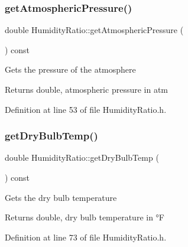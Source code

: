 \subsubsection{\texorpdfstring{get\+Atmospheric\+Pressure()}{getAtmosphericPressure()}\hspace{0.1cm}{\footnotesize\ttfamily [3/3]}}
{\footnotesize\ttfamily double Humidity\+Ratio\+::get\+Atmospheric\+Pressure (\begin{DoxyParamCaption}{ }\end{DoxyParamCaption}) const\hspace{0.3cm}{\ttfamily [inline]}}

Gets the pressure of the atmosphere

\begin{DoxyReturn}{Returns}
double, atmospheric pressure in atm 
\end{DoxyReturn}


Definition at line 53 of file Humidity\+Ratio.\+h.

\mbox{\label{class_humidity_ratio_a737b2faf32e5271b8062b175e1d018a9}} 
\subsubsection{\texorpdfstring{get\+Dry\+Bulb\+Temp()}{getDryBulbTemp()}\hspace{0.1cm}{\footnotesize\ttfamily [1/3]}}
{\footnotesize\ttfamily double Humidity\+Ratio\+::get\+Dry\+Bulb\+Temp (\begin{DoxyParamCaption}{ }\end{DoxyParamCaption}) const\hspace{0.3cm}{\ttfamily [inline]}}

Gets the dry bulb temperature

\begin{DoxyReturn}{Returns}
double, dry bulb temperature in °F 
\end{DoxyReturn}


Definition at line 73 of file Humidity\+Ratio.\+h.

\mbox{\label{class_humidity_ratio_a737b2faf32e5271b8062b175e1d018a9}} 
